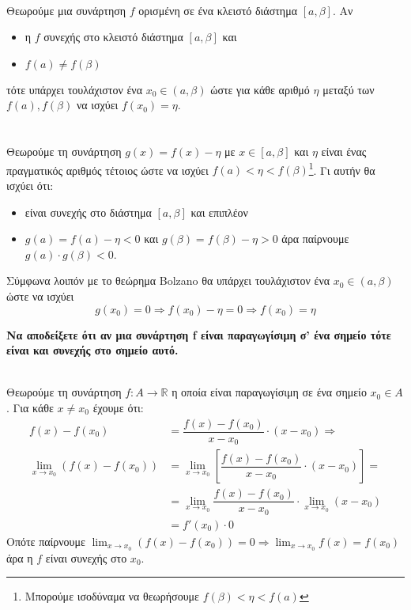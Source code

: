 \documentclass[a4paper,11pt,twoside]{article}
\def\xrwma{red!80!black}
\newcounter{Thewrhmabox}[section]
\renewcommand{\theThewrhmabox}{\arabic{Thewrhmabox}}
\newenvironment{Thewrhmabox}[2][\linewidth]
{\refstepcounter{Thewrhmabox}
\begin{tcolorbox}[breakable,
enhanced standard,
boxrule=0.7pt,titlerule=-.2pt,
width=\linewidth,
title style={color=white},
overlay unbroken and first={
\path[left color=\xrwma,right color=\xrwma!70!white]
([yshift=-\pgflinewidth]frame.north west) to ([yshift=-5pt]title.south west)[rounded corners=2pt] -- ([xshift=-#2-15pt,yshift=-5pt]title.south east) to[rounded corners=2pt] ([xshift=-#2,yshift=-\pgflinewidth]frame.north east) -- cycle;
},
fonttitle=\bfseries,
before=\par\medskip\noindent,
after=\par\medskip,
toptitle=3pt,
top=11pt,topsep at break=-5pt,
colback=white,title={\kerkissans{\faStop\ \ \large Θεώρημα \theThewrhmabox}} : {\textcolor{black}{\kerkissans{#1}}}]}
{\end{tcolorbox}}
\begin{document}
{}\\
Θεωρούμε μια συνάρτηση $f$ ορισμένη σε ένα κλειστό διάστημα $[a,\beta]$. Αν
\begin{itemize}
\item η $f$ συνεχής στο κλειστό διάστημα $[a,\beta]$ και 
\item $f(a)\neq f(\beta)$
\end{itemize}
τότε υπάρχει τουλάχιστον ένα $ x_0\in(a,\beta) $ ώστε για κάθε αριθμό $ \eta $ μεταξύ των $ f(a),f(\beta) $ να ισχύει $ f(x_0)=\eta $.\\\\
{}\\
Θεωρούμε τη συνάρτηση $ g(x)=f(x)-\eta $ με $ x\in[a,\beta] $ και $ \eta $ είναι ένας πραγματικός αριθμός τέτοιος ώστε να ισχύει $ f(a)<\eta<f(\beta) $\footnote{Μπορούμε ισοδύναμα να θεωρήσουμε $ f(\beta)<\eta<f(a) $}. Γι αυτήν θα ισχύει ότι:
\begin{itemize}
\item είναι συνεχής στο διάστημα $ [a,\beta] $ και επιπλέον
\item $ g(a)=f(a)-\eta<0 $ και $ g(\beta)=f(\beta)-\eta>0 $ άρα παίρνουμε $ g(a)\cdot g(\beta)<0 $.
\end{itemize}
Σύμφωνα λοιπόν με το θεώρημα Bolzano θα υπάρχει τουλάχιστον ένα $ x_0\in(a,\beta) $ ώστε να ισχύει \[ g(x_0)=0\Rightarrow f(x_0)-\eta=0\Rightarrow f(x_0)=\eta \]
\begin{Thewrhmabox}[Παραγωγίσιμη \bmath{$ \Rightarrow $} Συνεχής - Σελ. 217]{7cm}
\textbf{Να αποδείξετε ότι αν μια συνάρτηση f είναι παραγωγίσιμη σ’ ένα σημείο  τότε είναι και συνεχής στο σημείο αυτό. }
\end{Thewrhmabox}
\textbf{}\\
Θεωρούμε τη συνάρτηση $ f:A\to\mathbb{R} $ η οποία είναι παραγωγίσιμη σε ένα σημείο $ x_0\in A $. Για κάθε $ x\neq x_0 $ έχουμε ότι:
\begin{align*}
f(x)-f(x_0)&=\dfrac{f(x)-f(x_0)}{x-x_0}\cdot (x-x_0)\Rightarrow\\
\lim_{x\to x_0}{\left( f(x)-f(x_0)\right) }&=\lim_{x\to x_0}{\left[
\dfrac{f(x)-f(x_0)}{x-x_0}\cdot (x-x_0)\right]}=\\
&=\lim_{x\to x_0}{
\dfrac{f(x)-f(x_0)}{x-x_0}}\cdot \lim_{x\to x_0}{(x-x_0)}\\
&=f'(x_0)\cdot 0
\end{align*}
Οπότε παίρνουμε $ {\displaystyle \lim_{x\to x_0}{\left( f(x)-f(x_0)\right) }=0\Rightarrow \lim_{x\to x_0}{f(x)}=f(x_0)} $ άρα η $ f $ είναι συνεχής στο $ x_0 $.
\end{document}
